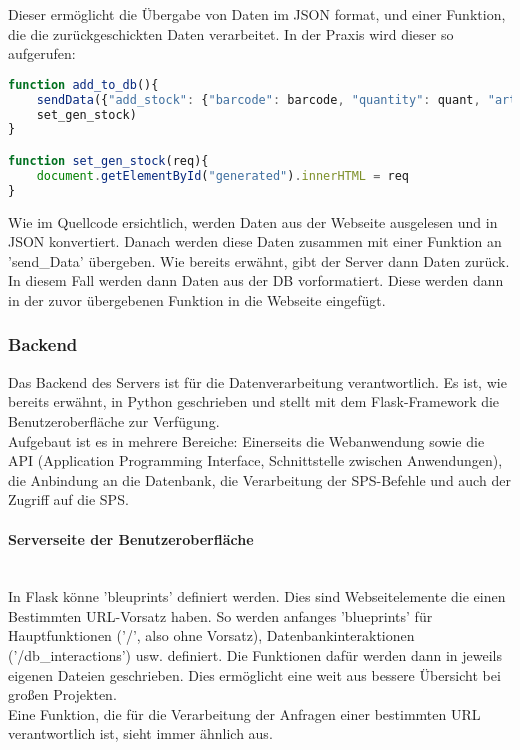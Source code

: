 Dieser ermöglicht die Übergabe von Daten im JSON format, und einer Funktion, die die zurückgeschickten Daten verarbeitet. In der Praxis wird dieser so aufgerufen:

\begin{lstlisting}[language=JavaScript]
function add_to_db(){
    sendData({"add_stock": {"barcode": barcode, "quantity": quant, "article": article}}, 
    set_gen_stock)
}

function set_gen_stock(req){
    document.getElementById("generated").innerHTML = req
}\end{lstlisting}

Wie im Quellcode ersichtlich, werden Daten aus der Webseite ausgelesen und in JSON konvertiert. Danach werden diese Daten zusammen mit einer Funktion an 'send\_Data' übergeben. Wie bereits erwähnt, gibt der Server dann Daten zurück. In diesem Fall werden dann Daten aus der DB vorformatiert. Diese werden dann in der zuvor übergebenen Funktion in die Webseite eingefügt.

\subsubsection{Backend}
Das Backend des Servers ist für die Datenverarbeitung verantwortlich. Es ist, wie bereits erwähnt, in Python geschrieben und stellt mit dem Flask-Framework die Benutzeroberfläche zur Verfügung. \\
Aufgebaut ist es in mehrere Bereiche: Einerseits die Webanwendung sowie die API (Application Programming Interface, Schnittstelle zwischen Anwendungen), die Anbindung an die Datenbank, die Verarbeitung der SPS-Befehle und auch der Zugriff auf die SPS.
 


\paragraph{Serverseite der Benutzeroberfläche}\mbox{}\\
In Flask könne 'bleuprints' definiert werden. Dies sind Webseitelemente die einen Bestimmten URL-Vorsatz haben. So werden anfanges 'blueprints' für Hauptfunktionen ('/', also ohne Vorsatz), Datenbankinteraktionen ('/db\_interactions') usw. definiert. Die Funktionen dafür werden dann in jeweils eigenen Dateien geschrieben. Dies ermöglicht eine weit aus bessere Übersicht bei großen Projekten. \\
Eine Funktion, die für die Verarbeitung der Anfragen einer bestimmten URL verantwortlich ist, sieht immer ähnlich aus.


